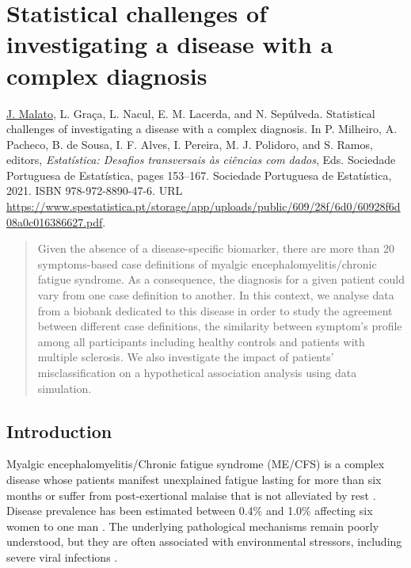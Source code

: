 \chapter{Statistical challenges of investigating a disease with a complex diagnosis}
\label{chapter:statical-challenges-2021}

\noindent\underline{J. Malato}, L. Graça, L. Nacul, E. M. Lacerda, and N. Sepúlveda. Statistical challenges of investigating a disease with a complex diagnosis. In P. Milheiro, A. Pacheco, B. de Sousa, I. F. Alves, I. Pereira, M. J. Polidoro, and S. Ramos, editors, \textit{Estatística: Desafios transversais às ciências com dados}, Eds. Sociedade Portuguesa de Estatística, pages 153--167. Sociedade Portuguesa de Estatística, 2021. ISBN 978-972-8890-47-6. URL \url{https://www.spestatistica.pt/storage/app/uploads/public/609/28f/6d0/60928f6d08a0c016386627.pdf}.

\begin{abstract}
Given the absence of a disease-specific biomarker, there are more than 20 symptoms-based case definitions of myalgic encephalomyelitis/chronic fatigue syndrome. As a consequence, the diagnosis for a given patient could vary from one case definition to another. In this context, we analyse data from a biobank dedicated to this disease in order to study the agreement between different case definitions, the similarity between symptom's profile among all participants including healthy controls and patients with multiple sclerosis. We also investigate the impact of patients' misclassification on a hypothetical association analysis using data simulation.
\end{abstract}

\section{Introduction}
\label{sec:introduction}

Myalgic encephalomyelitis/Chronic fatigue syndrome (ME/CFS) is a complex disease whose patients manifest unexplained fatigue lasting for more than six months \citep{fukuda1994ChronicFatigue} or suffer from post-exertional malaise that is not alleviated by rest \citep{carruthers2003MyalgicEncephalomyelitis}. Disease prevalence has been estimated between 0.4\% and 1.0\% affecting six women to one man \citep{morrisMyalgicEncephalomyelitisChronic2013}. The underlying pathological mechanisms remain poorly understood, but they are often associated with environmental stressors, including severe viral infections \citep{rasa2018ChronicViral}. 

